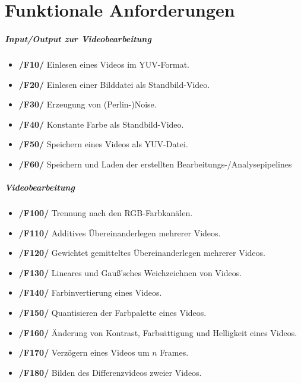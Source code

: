 \section{Funktionale Anforderungen}

\subparagraph{Input/Output zur Videobearbeitung} 
\begin{itemize} 
	\item \textbf{/F10/} Einlesen eines Videos im YUV-Format.
	\item \textbf{/F20/} Einlesen einer Bilddatei als Standbild-Video.
	\item \textbf{/F30/} Erzeugung von (Perlin-)Noise.
	\item \textbf{/F40/} Konstante Farbe als Standbild-Video.
	\item \textbf{/F50/} Speichern eines Videos als YUV-Datei.
	\item \textbf{/F60/} Speichern und Laden der erstellten Bearbeitungs-/Analysepipelines
\end{itemize}

\subparagraph{Videobearbeitung}
\begin{itemize}
	\item \textbf{/F100/} Trennung nach den RGB-Farbkanälen.
	\item \textbf{/F110/} Additives Übereinanderlegen mehrerer Videos.
	\item \textbf{/F120/} Gewichtet gemitteltes Übereinanderlegen mehrerer Videos.
	\item \textbf{/F130/} Lineares und Gauß'sches Weichzeichnen von Videos.
	\item \textbf{/F140/} Farbinvertierung eines Videos.
	\item \textbf{/F150/} Quantisieren der Farbpalette eines Videos.
	\item \textbf{/F160/} Änderung von Kontrast, Farbsättigung und Helligkeit eines Videos.
	\item \textbf{/F170/} Verzögern eines Videos um $n$ Frames.	
	\item \textbf{/F180/} Bilden des Differenzvideos zweier Videos.
\end{itemize}

